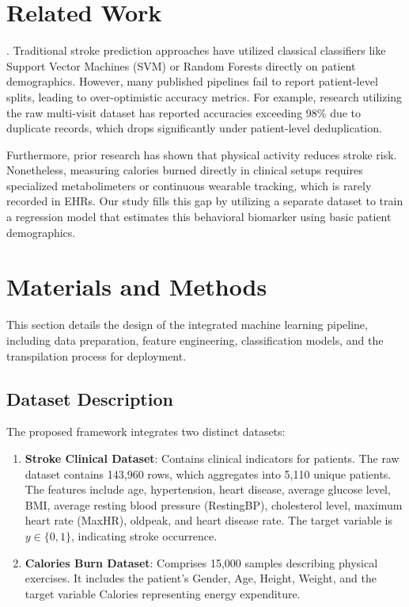 \documentclass[11pt,letterpaper]{article}
\begin{document}
\section{Related Work}
. Traditional stroke prediction approaches have utilized classical classifiers like Support Vector Machines (SVM) or Random Forests directly on patient demographics. However, many published pipelines fail to report patient-level splits, leading to over-optimistic accuracy metrics. For example, research utilizing the raw multi-visit dataset has reported accuracies exceeding 98\% due to duplicate records, which drops significantly under patient-level deduplication. 

Furthermore, prior research has shown that physical activity reduces stroke risk. Nonetheless, measuring calories burned directly in clinical setups requires specialized metabolimeters or continuous wearable tracking, which is rarely recorded in EHRs. Our study fills this gap by utilizing a separate dataset to train a regression model that estimates this behavioral biomarker using basic patient demographics.

\section{Materials and Methods}
This section details the design of the integrated machine learning pipeline, including data preparation, feature engineering, classification models, and the transpilation process for deployment.

\subsection{Dataset Description}
The proposed framework integrates two distinct datasets:
\begin{enumerate}
    \item \textbf{Stroke Clinical Dataset}: Contains clinical indicators for patients. The raw dataset contains 143,960 rows, which aggregates into 5,110 unique patients. The features include age, hypertension, heart disease, average glucose level, BMI, average resting blood pressure (RestingBP), cholesterol level, maximum heart rate (MaxHR), oldpeak, and heart disease rate. The target variable is $y \in \{0,1\}$, indicating stroke occurrence.
    \item \textbf{Calories Burn Dataset}: Comprises 15,000 samples describing physical exercises. It includes the patient's Gender, Age, Height, Weight, and the target variable Calories representing energy expenditure.
\end{enumerate}
\end{document}
